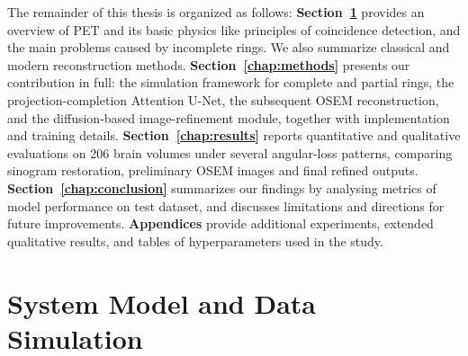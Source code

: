 \documentclass[aps,prb,preprint,groupedaddress,showkeys]{revtex4}
\begin{document}
The remainder of this thesis is organized as follows:
\textbf{Section~\ref{chap:background}} provides an overview of PET and its basic physics like principles of coincidence detection, and the main problems caused by incomplete rings. We also summarize classical and modern reconstruction methods.
\textbf{Section~\ref{chap:methods}} presents our contribution in full: the simulation framework for complete and partial rings, the projection-completion Attention U-Net, the subsequent OSEM reconstruction, and the diffusion-based image-refinement module, together with implementation and training details.
\textbf{Section~\ref{chap:results}} reports quantitative and qualitative evaluations on 206 brain volumes under several angular-loss patterns, comparing sinogram restoration, preliminary OSEM images and final refined outputs.
\textbf{Section~\ref{chap:conclusion}} summarizes our findings by analysing metrics of model performance on test dataset, and discusses limitations and directions for future improvements.
\textbf{Appendices} provide additional experiments, extended qualitative results, and tables of hyperparameters used in the study.




\section{System Model and Data Simulation}

\label{chap:background}
\end{document}
